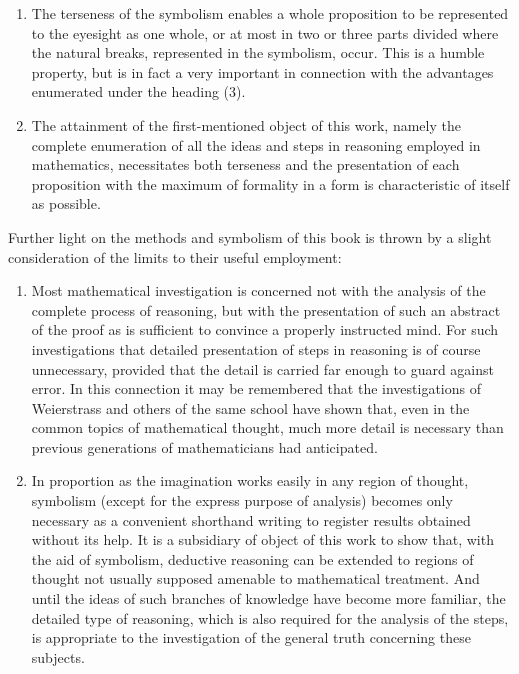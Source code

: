 \documentclass[letterpaper,12pt,openany,leqno]{book}
\newcommand{\pagefirst}[1]{\marginnote[\boxed{\text{#1}}]{\boxed{\text{#1}}}}
\begin{document}
\begin{enumerate}[wide, label=(\arabic*), labelwidth=!, labelindent=20pt]
	\item \pagefirst{3} The terseness of the symbolism enables a whole proposition to be represented to the eyesight as one whole, or at most in two or three parts divided where the natural breaks, represented in the symbolism, occur. This is a humble property, but is in fact a very important in connection with the advantages enumerated under the heading (3). 
	\item The attainment of the first-mentioned object of this work, namely the complete enumeration of all the ideas and steps in reasoning employed in mathematics, necessitates both terseness and the presentation of each proposition with the maximum of formality in a form is characteristic of itself as possible. 
\end{enumerate}

Further light on the methods and symbolism of this book is thrown by a slight consideration of the limits to their useful employment:

\begin{enumerate}[wide, label=(\greek*), labelwidth=!, labelindent=20pt]
	\item Most mathematical investigation is concerned not with the analysis of the complete process of reasoning, but with the presentation of such an abstract of the proof as is sufficient to convince a properly instructed mind. For such investigations that detailed presentation of steps in reasoning is of course unnecessary, provided that the detail is carried far enough to guard against error. In this connection it may be remembered that the investigations of Weierstrass and others of the same school have shown that, even in the common topics of mathematical thought, much more detail is necessary than previous generations of mathematicians had anticipated. 
	\item In proportion as the imagination works easily in any region of thought, symbolism (except for the express purpose of analysis) becomes only necessary as a convenient shorthand writing to register results obtained without its help. It is a subsidiary of object of this work to show that, with the aid of symbolism, deductive reasoning can be extended to regions of thought not usually supposed amenable to mathematical treatment. And until the ideas of such branches of knowledge have become more familiar, the detailed type of reasoning, which is also required for the analysis of the steps, is appropriate to the investigation of the general truth concerning these subjects. 
\end{enumerate}
\end{document}
